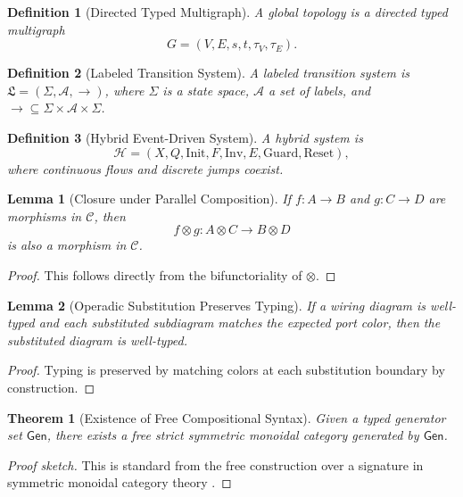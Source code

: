 \documentclass[11pt]{article}
\newtheorem{definition}{Definition}[section]
\newtheorem{theorem}{Theorem}[section]
\newtheorem{lemma}{Lemma}[section]
\theoremstyle{remark}
\begin{document}
\begin{definition}[Directed Typed Multigraph]
A global topology is a directed typed multigraph
\[
G=(V,E,s,t,\tau_V,\tau_E).
\]
\end{definition}

\begin{definition}[Labeled Transition System]
A labeled transition system is \(\mathfrak{L}=(\Sigma,\mathcal{A},\to)\), where \(\Sigma\) is a state space, \(\mathcal{A}\) a set of labels, and \(\to \subseteq \Sigma\times\mathcal{A}\times\Sigma\).
\end{definition}

\begin{definition}[Hybrid Event-Driven System]
A hybrid system is
\[
\mathcal{H}=(X,Q,\mathrm{Init},F,\mathrm{Inv},E,\mathrm{Guard},\mathrm{Reset}),
\]
where continuous flows and discrete jumps coexist.
\end{definition}

\begin{lemma}[Closure under Parallel Composition]
If \(f:A\to B\) and \(g:C\to D\) are morphisms in \(\mathcal{C}\), then
\[
f\otimes g : A\otimes C \to B\otimes D
\]
is also a morphism in \(\mathcal{C}\).
\end{lemma}

\begin{proof}
This follows directly from the bifunctoriality of \(\otimes\).
\end{proof}

\begin{lemma}[Operadic Substitution Preserves Typing]
If a wiring diagram is well-typed and each substituted subdiagram matches the expected port color, then the substituted diagram is well-typed.
\end{lemma}

\begin{proof}
Typing is preserved by matching colors at each substitution boundary by construction.
\end{proof}

\begin{theorem}[Existence of Free Compositional Syntax]
Given a typed generator set \(\mathsf{Gen}\), there exists a free strict symmetric monoidal category generated by \(\mathsf{Gen}\).
\end{theorem}

\begin{proof}[Proof sketch]
This is standard from the free construction over a signature in symmetric monoidal category theory \cite{fongspivak2019}.
\end{proof}
\end{document}
